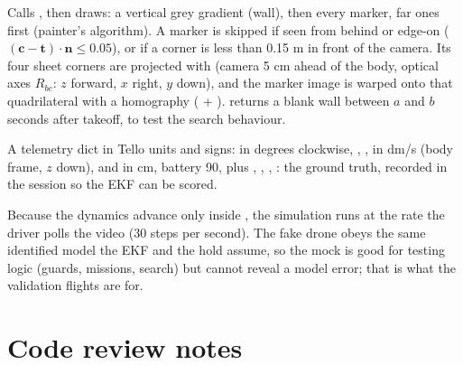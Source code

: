 Calls , then draws: a vertical grey gradient (wall), then every marker, far ones first (painter's
algorithm). A marker is skipped if seen from behind or edge-on ($(\bm c-\bm t)\cdot\bm n \le 0.05$), or if a corner
is less than 0.15 m in front of the camera. Its four sheet corners are projected with 
(camera 5 cm ahead of the body, optical axes $R_{bc}$: $z$ forward, $x$ right, $y$ down), and the marker image is
warped onto that quadrilateral with a homography ( + ).
 returns a blank wall between $a$ and $b$ seconds after takeoff, to test the search
behaviour.

A telemetry dict in Tello units and signs:  in degrees clockwise, , ,  in
dm/s (body frame, $z$ down),  and  in cm, battery 90, plus , ,
, : the ground truth, recorded in the session so the EKF can be scored.

\begin{intuition}
Because the dynamics advance only inside , the simulation runs at the rate the driver polls the video
(30 steps per second). The fake drone obeys the same identified model the EKF and the hold assume, so the mock is
good for testing logic (guards, missions, search) but cannot reveal a model error; that is what the validation
flights are for.
\end{intuition}

\section{Code review notes}
\label{sec:driver-review}

